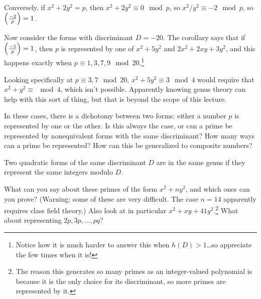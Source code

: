 Conversely, if $x^2+2y^2 = p$, then $x^2+2y^2 \equiv 0\mod p$, so $x^2/y^2 \equiv -2\mod p$, so $\left(\frac{-2}{p}\right) = 1$.

Now consider the forms with discriminant $D = -20$. The corollary says that if $\left(\frac{-5}{p}\right) = 1$, then $p$ is represented by one of $x^2+5y^2$ and $2x^2+2xy+3y^2$, and this happens exactly when $p\equiv 1,3,7,9\mod 20$.\footnote{Notice how it is much harder to answer this when $h(D) > 1$\dots so appreciate the few times when it is!}

Looking specifically at $p \equiv 3,7\mod 20$, $x^2+5y^2 \equiv 3\mod 4$ would require that $x^2+y^2 \equiv \mod 4$, which isn't possible. Apparently knowing genus theory can help with this sort of thing, but that is beyond the scope of this lecture.

\begin{ex}
In these cases, there is a dichotomy between two forms: either a number $p$ is represented by one or the other. Is this always the case, or can a prime be represented by nonequivalent forms with the same discriminant? How many ways can a prime be represented? How can this be generalized to composite numbers?
\end{ex}
\begin{defn}
Two quadratic forms of the same discriminant $D$ are in the same genus if they represent the same integers modulo $D$.
\end{defn}
\begin{ex}
What can you say about these primes of the form $x^2+ny^2$, and which ones can you prove? (Warning: some of these are very difficult. The case $n = 14$ apparently requires class field theory.) Also look at in particular $x^2+xy+41y^2$.\footnote{The reason this generates so many primes as an integer-valued polynomial is because it is the only choice for its discriminant, so more primes are represented by it.} What about representing $2p,3p,\dots,pq$?
\end{ex}
